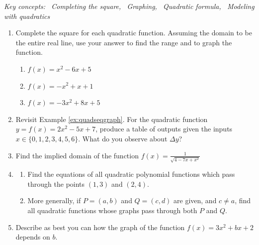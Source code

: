 \begin{exercises}{}{}
	\hangindent\leftmargini
	\emph{Key concepts: \ Completing the square, \ Graphing, \ Quadratic formula, \ Modeling with quadratics}
	
	\begin{enumerate}
	  \item Complete the square for each quadratic function. Assuming the domain to be the entire real line, use your answer to find the range and to graph the function.
	  \begin{enumerate}
	    \item $f(x)=x^2-6x+5$ %
	    \item $f(x)=-x^2+x+1$ %
	    \item $f(x)=-3x^2+8x+5$ %
	  \end{enumerate}
	 
	  
	  \item Revisit Example \ref{ex:quadseqgraph}. For the quadratic function $y=f(x)=2x^2-5x+7$, produce a table of outputs given the inputs $x\in\{0,1,2,3,4,5,6\}$. What do you observe about $\Delta y$?
	  
	  
	  
	  \item Find the implied domain of the function $f(x)=\frac 1{\sqrt{4-7x+x^2}}$
	  
	  
		\item\begin{enumerate}
		  \item Find the equations of all quadratic polynomial functions which pass through the points $(1,3)$ and $(2,4)$.
			\item More generally, if $P=(a,b)$ and $Q=(c,d)$ are given, and $c\neq a$, find all quadratic functions whose graphs pass through both $P$ and $Q$.
		\end{enumerate}
		
		
		\item Describe as best you can how the graph of the function $f(x)=3x^2+bx+2$ depends on $b$.
	  

\end{enumerate}
\end{exercises}
